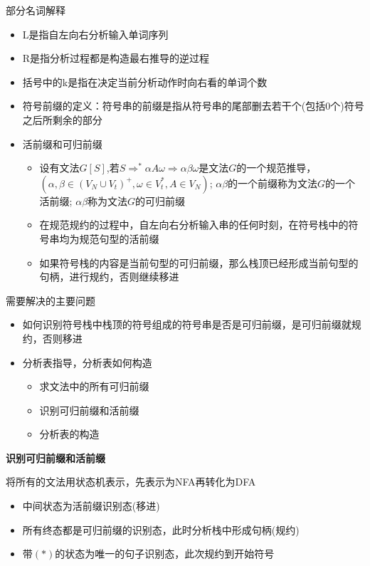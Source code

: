 \documentclass[utf8]{ctexart}
\begin{document}
\noindent 部分名词解释
\begin{itemize}
    \item L是指自左向右分析输入单词序列
    \item R是指分析过程都是构造最右推导的逆过程
    \item 括号中的k是指在决定当前分析动作时向右看的单词个数
    \item 符号前缀的定义：符号串的前缀是指从符号串的尾部删去若干个(包括0个)符号之后所剩余的部分
    \item 活前缀和可归前缀
    \begin{itemize}
        \item  设有文法$G[S]$,若$S \Rightarrow ^*\alpha A \omega \Rightarrow \alpha \beta \omega$是文法$G$的一个规范推导，$(\alpha ,\beta \in (V_N \cup V_t)^+, \omega \in V_t^*, A \in V_N)$;
        $\alpha \beta$的一个前缀称为文法$G$的一个活前缀;
        $\alpha \beta$称为文法$G$的可归前缀
        \item 在规范规约的过程中，自左向右分析输入串的任何时刻，在符号栈中的符号串均为规范句型的活前缀
        \item 如果符号栈的内容是当前句型的可归前缀，那么栈顶已经形成当前句型的句柄，进行规约，否则继续移进
    \end{itemize}
\end{itemize}

\noindent 需要解决的主要问题
\begin{itemize}
    \item 如何识别符号栈中栈顶的符号组成的符号串是否是可归前缀，是可归前缀就规约，否则移进
    \item 分析表指导，分析表如何构造
    \begin{itemize}
        \item 求文法中的所有可归前缀
        \item 识别可归前缀和活前缀
        \item 分析表的构造
    \end{itemize}
\end {itemize}

\noindent\textbf{识别可归前缀和活前缀}

\noindent 将所有的文法用状态机表示，先表示为NFA再转化为DFA
\begin{itemize}
    \item 中间状态为活前缀识别态(移进)
    \item 所有终态都是可归前缀的识别态，此时分析栈中形成句柄(规约)
    \item 带$(*)$的状态为唯一的句子识别态，此次规约到开始符号
\end{itemize}
\end{document}
